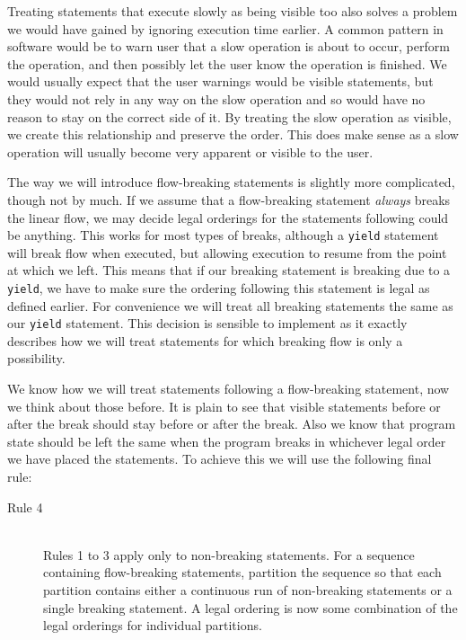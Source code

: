 \documentclass[twoside,a4paper]{report}
\begin{document}
Treating statements that execute slowly as being visible too also solves a problem we would have gained by ignoring execution time earlier. A common
pattern in software would be to warn user that a slow operation is about to occur, perform the operation, and then possibly let the user know the
operation is finished. We would usually expect that the user warnings would be visible statements, but they would not rely in any way on the slow
operation and so would have no reason to stay on the correct side of it. By treating the slow operation as visible, we create this relationship and preserve
the order. This does make sense as a slow operation will usually become very apparent or visible to the user.

The way we will introduce flow-breaking statements is slightly more complicated, though not by much. If we assume that a flow-breaking statement
\textit{always} breaks the linear flow, we may decide legal orderings for the statements following could be anything. This works for most types of
breaks, although a \texttt{yield} statement will break flow when executed, but allowing execution to resume from the point at which we left. This means that if our
breaking statement is breaking due to a \texttt{yield}, we have to make sure the ordering following this statement is legal as defined earlier.
For convenience we will treat all breaking statements the same as our \texttt{yield} statement. This decision is sensible to implement as it exactly describes
how we will treat statements for which breaking flow is only a possibility.

We know how we will treat statements following a flow-breaking statement, now we think about those before. It is plain to see that visible
statements before or after the break should stay before or after the break. Also we know that program state should be left the same when the program breaks
in whichever legal order we have placed the statements. To achieve this we will use the following final rule:

\begin{description}
\item[Rule 4] \hfill \\
Rules 1 to 3 apply only to non-breaking statements. For a sequence containing flow-breaking statements, partition the sequence so that each partition
contains either a continuous run of non-breaking statements or a single breaking statement. A legal ordering is now some combination of the legal orderings
for individual partitions.
\end{description}
\end{document}
